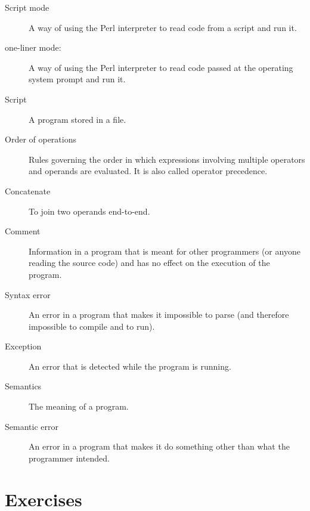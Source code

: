 \begin{description}
\item[Script mode] A way of using the Perl interpreter to read
code from a script and run it.

\item[one-liner mode:] A way of using the Perl interpreter to read
code passed at the operating system prompt and run it.

\item[Script] A program stored in a file.

\item[Order of operations]  Rules governing the order in which
expressions involving multiple operators and operands are evaluated.
It is also called operator precedence.

\item[Concatenate]  To join two operands end-to-end.

\item[Comment]  Information in a program that is meant for other
programmers (or anyone reading the source code) and has no effect on the
execution of the program.

\item[Syntax error]  An error in a program that makes it impossible
to parse (and therefore impossible to compile and to run).

\item[Exception]  An error that is detected while the program is running.

\item[Semantics]  The meaning of a program.

\item[Semantic error]   An error in a program that makes it do something
other than what the programmer intended.

\end{description}


\section{Exercises}

